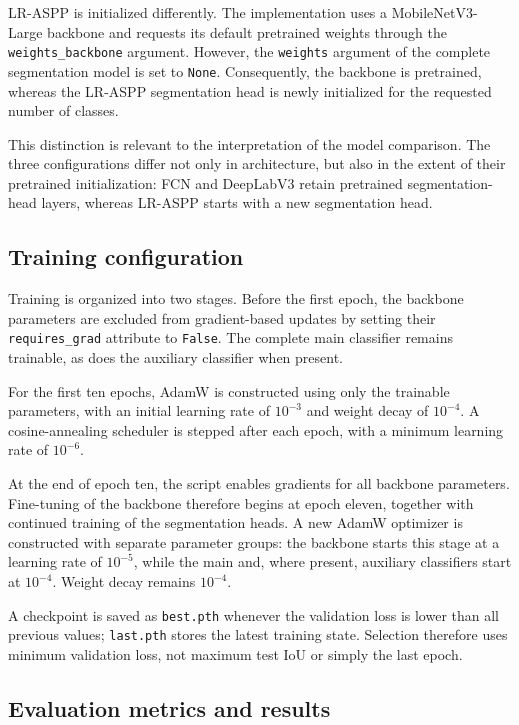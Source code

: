 LR-ASPP is initialized differently. The implementation uses a
MobileNetV3-Large backbone and requests its default pretrained weights
through the \texttt{weights\_\allowbreak backbone} argument. However, the
\texttt{weights} argument of the complete segmentation model is set to
\texttt{None}. Consequently, the backbone is pretrained, whereas the
LR-ASPP segmentation head is newly initialized for the requested number
of classes.

This distinction is relevant to the interpretation of the model
comparison. The three configurations differ not only in architecture,
but also in the extent of their pretrained initialization: FCN and
DeepLabV3 retain pretrained segmentation-head layers, whereas LR-ASPP
starts with a new segmentation head.

\subsection{Training configuration}
\label{subsec:c4_training_config}

Training is organized into two stages. Before the first epoch, the
backbone parameters are excluded from gradient-based updates by setting
their \texttt{requires\_grad} attribute to \texttt{False}. The complete
main classifier remains trainable, as does the auxiliary classifier when
present.

For the first ten epochs, AdamW is constructed using only the trainable
parameters, with an initial learning rate of $10^{-3}$ and weight decay
of $10^{-4}$. A cosine-annealing scheduler is stepped after each epoch,
with a minimum learning rate of $10^{-6}$.

At the end of epoch ten, the script enables gradients for all backbone
parameters. Fine-tuning of the backbone therefore begins at epoch eleven,
together with continued training of the segmentation heads. A new AdamW
optimizer is constructed with separate parameter groups: the backbone
starts this stage at a learning rate of $10^{-5}$, while the main and,
where present, auxiliary classifiers start at $10^{-4}$. Weight decay
remains $10^{-4}$.

A checkpoint is saved as \texttt{best.pth} whenever the validation loss is lower than all previous
values; \texttt{last.pth} stores the latest training state. Selection
therefore uses minimum validation loss, not maximum test IoU or simply
the last epoch.

\subsection{Evaluation metrics and results}
\label{subsec:c4_architecture_results}


